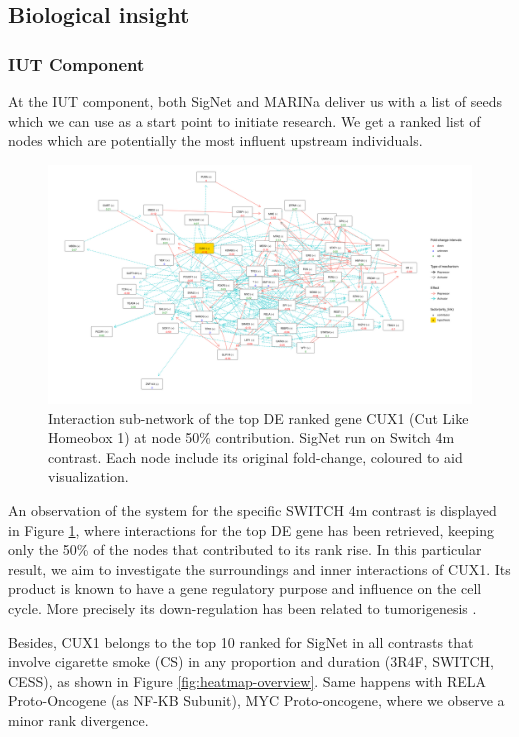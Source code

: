 \subsection{Biological insight}
\subsubsection{IUT Component}
At the IUT component, both SigNet and MARINa deliver us with a list of seeds which we can use as a start point to initiate research. We get a ranked list of nodes which are potentially the most influent upstream individuals.
\\

\begin{figure}[!ht]
    \centering
    \includegraphics[width=\textwidth, height=\textheight, keepaspectratio]{Major Thesis/figures/iut/graph/SWITCH4m50-CUX1.png}
    \caption{Interaction sub-network of the top DE ranked gene CUX1 (Cut Like Homeobox 1) at node 50\% contribution. SigNet run on Switch 4m contrast. Each node include its original fold-change, coloured to aid visualization.}
    \label{fig:graph-expansion}
\end{figure}

An observation of the system for the specific SWITCH 4m contrast is displayed in Figure \ref{fig:graph-expansion}, where interactions for the top DE gene has been retrieved, keeping only the 50\% of the nodes that contributed to its rank rise. In this particular result, we aim to investigate the surroundings and inner interactions of CUX1. Its product is known to have a gene regulatory purpose and influence on the cell cycle. More precisely its down-regulation has been related to tumorigenesis \cite{Wong2014InactivatingTumorigenesis}.


Besides, CUX1 belongs to the top 10 ranked for SigNet in all contrasts that involve cigarette smoke (CS) in any proportion and duration (3R4F, SWITCH, CESS), as shown in Figure \ref{fig:heatmap-overview}. Same happens with RELA Proto-Oncogene (as NF-KB Subunit), MYC Proto-oncogene, where we observe a minor rank divergence.
\\


